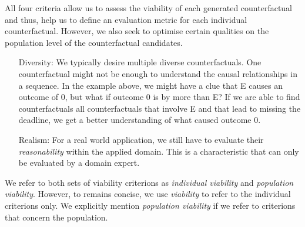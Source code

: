 \documentclass[./../../paper.tex]{subfiles}
\begin{document}
\noindent All four criteria allow us to assess the viability of each generated counterfactual and thus, help us to define an evaluation metric for each individual counterfactual. However, we also seek to optimise certain qualities on the population level of the counterfactual candidates.  

\begin{itemize}
    \item[Diversity:] We typically desire multiple diverse counterfactuals. One counterfactual might not be enough to understand the causal relationships in a sequence. In the example above, we might have a clue that E causes an outcome of 0, but what if outcome 0 is by more than E? If we are able to find counterfactuals all counterfactuals that involve E and that lead to missing the deadline, we get a better understanding of what caused outcome 0.
    \item[Realism:] For a real world application, we still have to evaluate their \emph{reasonability} within the applied domain. This is a characteristic that can only be evaluated by a domain expert. 
\end{itemize}

We refer to both sets of viability criterions as \emph{individual viability} and \emph{population viability}. However, to remains concise, we use \emph{viability} to refer to the individual criterions only. We explicitly mention \emph{population viability} if we refer to criterions that concern the population.
\end{document}
